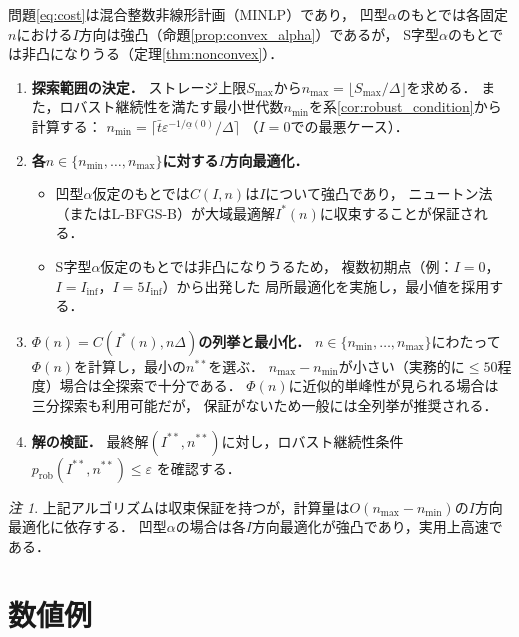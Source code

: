 \documentclass[12pt,a4paper]{article}
\theoremstyle{plain}
\theoremstyle{definition}
\theoremstyle{remark}
\newtheorem{remark}[theorem]{注}
\begin{document}
問題\eqref{eq:cost}は混合整数非線形計画（MINLP）であり，
凹型$\alpha$のもとでは各固定$n$における$I$方向は強凸（命題\ref{prop:convex_alpha}）であるが，
S字型$\alpha$のもとでは非凸になりうる（定理\ref{thm:nonconvex}）．

\begin{enumerate}[label=\textbf{Step \arabic*.}, leftmargin=*, wide=0pt]
  \item \textbf{探索範囲の決定．}
    ストレージ上限$S_{\max}$から$n_{\max} = \lfloor S_{\max}/\Delta \rfloor$を求める．
    また，ロバスト継続性を満たす最小世代数$n_{\min}$を系\ref{cor:robust_condition}から計算する：
    $n_{\min} = \lceil \bar{t}\varepsilon^{-1/\underline{\alpha}(0)} / \Delta \rceil$
    （$I=0$での最悪ケース）．

  \item \textbf{各$n \in \{n_{\min},\ldots, n_{\max}\}$に対する$I$方向最適化．}
    \begin{itemize}
      \item 凹型$\alpha$仮定のもとでは$C(I,n)$は$I$について強凸であり，
        ニュートン法（またはL-BFGS-B）が大域最適解$I^*(n)$に収束することが保証される．
      \item S字型$\alpha$仮定のもとでは非凸になりうるため，
        複数初期点（例：$I=0$，$I=I_{\mathrm{inf}}$，$I=5I_{\mathrm{inf}}$）から出発した
        局所最適化を実施し，最小値を採用する．
    \end{itemize}

  \item \textbf{$\Phi(n) = C(I^*(n), n\Delta)$の列挙と最小化．}
    $n \in \{n_{\min},\ldots,n_{\max}\}$にわたって$\Phi(n)$を計算し，最小の$n^{**}$を選ぶ．
    $n_{\max} - n_{\min}$が小さい（実務的に$\le 50$程度）場合は全探索で十分である．
    $\Phi(n)$に近似的単峰性が見られる場合は三分探索も利用可能だが，
    保証がないため一般には全列挙が推奨される．

  \item \textbf{解の検証．}
    最終解$(I^{**}, n^{**})$に対し，ロバスト継続性条件$p_{\mathrm{rob}}(I^{**},n^{**}) \le \varepsilon$
    を確認する．
\end{enumerate}

\begin{remark}
上記アルゴリズムは収束保証を持つが，計算量は$O(n_{\max} - n_{\min})$の$I$方向最適化に依存する．
凹型$\alpha$の場合は各$I$方向最適化が強凸であり，実用上高速である．
\end{remark}

\section{数値例}
\label{sec:numerical}
\end{document}
